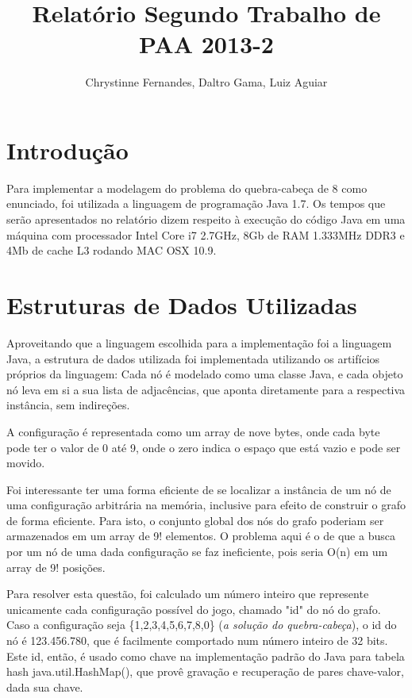 \documentclass[10pt,a4paper]{report}
\author{Chrystinne Fernandes, Daltro Gama, Luiz Aguiar}
\title{Relatório Segundo Trabalho de PAA 2013-2}
\begin{document}
\maketitle
\begin{titlepage}
\end{titlepage}

\section*{Introdução}

Para implementar a modelagem do problema do quebra-cabeça de 8 como enunciado, foi utilizada a linguagem de programação Java 1.7. Os tempos que serão apresentados no relatório dizem respeito à execução do código Java em uma máquina com processador Intel Core i7 2.7GHz, 8Gb de RAM 1.333MHz DDR3 e 4Mb de cache L3 rodando MAC OSX 10.9.

\section*{Estruturas de Dados Utilizadas}

Aproveitando que a linguagem escolhida para a implementação foi a linguagem Java, a estrutura de dados utilizada foi implementada utilizando os artifícios próprios da linguagem: Cada nó é modelado como uma classe Java, e cada objeto nó leva em si a sua lista de adjacências, que aponta diretamente para a respectiva instância, sem indireções.

A configuração é representada como um array de nove bytes, onde cada byte pode ter o valor de 0 até 9, onde o zero indica o espaço que está vazio e pode ser movido.

Foi interessante ter uma forma eficiente de se localizar a instância de um nó de uma configuração arbitrária na memória, inclusive para efeito de construir o grafo de forma eficiente. Para isto, o conjunto global dos nós do grafo poderiam ser armazenados em um array de 9! elementos. O problema aqui é o de que a busca por um nó de uma dada configuração se faz ineficiente, pois seria O(n) em um array de 9! posições.

Para resolver esta questão, foi calculado um número inteiro que represente unicamente cada configuração possível do jogo, chamado "id" do nó do grafo. Caso a configuração seja \{1,2,3,4,5,6,7,8,0\} (\textit{a solução do quebra-cabeça}), o id do nó é 123.456.780, que é facilmente comportado num número inteiro de 32 bits. Este id, então, é usado como chave na implementação padrão do Java para tabela hash java.util.HashMap(), que provê gravação e recuperação de pares chave-valor, dada sua chave.
\end{document}
